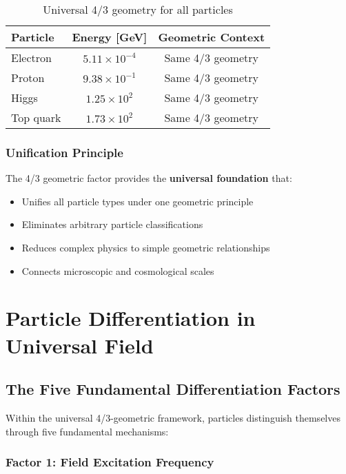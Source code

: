 \documentclass[12pt,a4paper]{article}
\newcommand{\mytimes}{\ensuremath{\times}}
\begin{document}
	\begin{table}[htbp]
		\centering
		\begin{tabular}{lcc}
			\toprule
			\textbf{Particle} & \textbf{Energy [GeV]} & \textbf{Geometric Context} \\
			\midrule
			Electron & $5.11 \mytimes 10^{-4}$ & Same 4/3 geometry \\
			Proton & $9.38 \mytimes 10^{-1}$ & Same 4/3 geometry \\
			Higgs & $1.25 \mytimes 10^{2}$ & Same 4/3 geometry \\
			Top quark & $1.73 \mytimes 10^{2}$ & Same 4/3 geometry \\
			\bottomrule
		\end{tabular}
		\caption{Universal 4/3 geometry for all particles}
		\label{tab:universal_geometry}
	\end{table}
	
	\subsubsection{Unification Principle}
	\label{subsubsec:unification_principle}
	
	The 4/3 geometric factor provides the \textbf{universal foundation} that:
	\begin{itemize}
		\item Unifies all particle types under one geometric principle
		\item Eliminates arbitrary particle classifications
		\item Reduces complex physics to simple geometric relationships
		\item Connects microscopic and cosmological scales
	\end{itemize}
	
	\section{Particle Differentiation in Universal Field}
	\label{sec:particle_differentiation}
	
	\subsection{The Five Fundamental Differentiation Factors}
	\label{subsec:five_factors}
	
	Within the universal 4/3-geometric framework, particles distinguish themselves through five fundamental mechanisms:
	
	\subsubsection{Factor 1: Field Excitation Frequency}
	\label{subsubsec:excitation_frequency}
	
\end{document}
